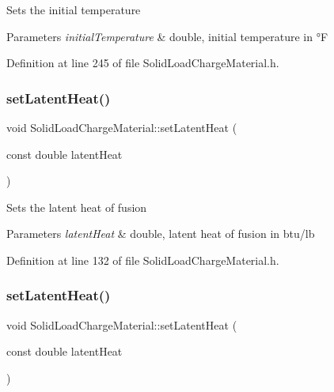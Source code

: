 Sets the initial temperature 
\begin{DoxyParams}{Parameters}
{\em initial\+Temperature} & double, initial temperature in °F \\
\hline
\end{DoxyParams}


Definition at line 245 of file Solid\+Load\+Charge\+Material.\+h.

\mbox{\label{class_solid_load_charge_material_ac7361119ab7cc352dfbdc6fcb9175981}} 
\subsubsection{\texorpdfstring{set\+Latent\+Heat()}{setLatentHeat()}\hspace{0.1cm}{\footnotesize\ttfamily [1/3]}}
{\footnotesize\ttfamily void Solid\+Load\+Charge\+Material\+::set\+Latent\+Heat (\begin{DoxyParamCaption}\item[{const double}]{latent\+Heat }\end{DoxyParamCaption})\hspace{0.3cm}{\ttfamily [inline]}}

Sets the latent heat of fusion 
\begin{DoxyParams}{Parameters}
{\em latent\+Heat} & double, latent heat of fusion in btu/lb \\
\hline
\end{DoxyParams}


Definition at line 132 of file Solid\+Load\+Charge\+Material.\+h.

\mbox{\label{class_solid_load_charge_material_ac7361119ab7cc352dfbdc6fcb9175981}} 
\subsubsection{\texorpdfstring{set\+Latent\+Heat()}{setLatentHeat()}\hspace{0.1cm}{\footnotesize\ttfamily [2/3]}}
{\footnotesize\ttfamily void Solid\+Load\+Charge\+Material\+::set\+Latent\+Heat (\begin{DoxyParamCaption}\item[{const double}]{latent\+Heat }\end{DoxyParamCaption})\hspace{0.3cm}{\ttfamily [inline]}}

